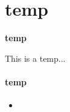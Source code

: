 \section{temp}

\begin{frame}
    \centering
    \LARGE \textbf{\textcolor{structure}{temp}}
\end{frame}

\begin{frame}{This is a temp...}
    \framesubtitle{temp}
    \begin{itemize}
    \item  
    \end{itemize} 
    
\end{frame}
